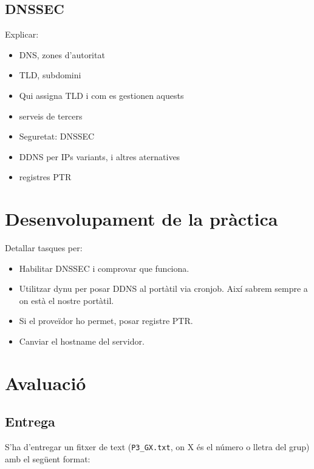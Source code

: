 \documentclass{practicaitic}
\begin{document}
\subsection{DNSSEC}



Explicar:
\begin{itemize}
  \item DNS, zones d'autoritat
  \item TLD, subdomini
  \item Qui assigna TLD i com es gestionen aquests
  \item serveis de tercers
  \item Seguretat: DNSSEC
  \item DDNS per IPs variants, i altres aternatives
  \item registres PTR
\end{itemize}

\section{Desenvolupament de la pràctica}

Detallar tasques per:
\begin{itemize}
  \item Habilitar DNSSEC i comprovar que funciona.
  \item Utilitzar dynu per posar DDNS al portàtil via cronjob. Així sabrem
  sempre a on està el nostre portàtil.
  \item Si el proveïdor ho permet, posar registre PTR.
  \item Canviar el hostname del servidor.
\end{itemize}

\section{Avaluació}
\subsection{Entrega}
\label{sec:entrega}

S'ha d'entregar un fitxer de text (\texttt{P3\_GX.txt}, on X és el número o 
lletra del grup) amb el següent format:
\end{document}
